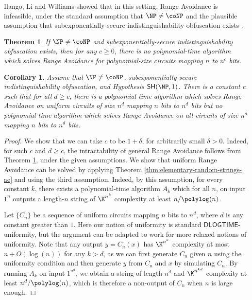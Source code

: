\documentclass[11pt]{article}
\newtheorem{theorem}{Theorem}
\newtheorem{corollary}{Corollary}
\newcommand{\SH}{\mathsf{SH}}
\newcommand{\DLOGTIME}{\mathsf{DLOGTIME}}
\begin{document}
Ilango, Li and Williams \cite{ILW23} showed that in this setting, Range Avoidance is infeasible, under the standard assumption that $\NP \neq \coNP$ and the plausible assumption that subexponentially-secure indistinguishability obfuscation exists \cite{JLS21}.

\begin{theorem}
\label{t:ILW} \cite{ILW23}
If $\NP \neq \coNP$ and subexponentially-secure indistinguishability obfuscation exists, then for any $c \geq 0$, there is no polynomial-time algorithm which solves Range Avoidance for polynomial-size circuits mapping $n$ to $n^c$ bits.
\end{theorem}

\begin{corollary}
\label{c:UnifvsNonunifP}
Assume that $\NP \neq \coNP$, subexponentially-secure indistinguishability obfuscation, and Hypothesis $\SH(\NP,1)$. There is a constant $c$ such that for all $d \geq c$, there is a polynomial-time algorithm which solves Range Avoidance on {\it uniform} circuits of size $n^d$ mapping $n$ bits to $n^d$ bits but no polynomial-time algorithm which solves Range Avoidance on all circuits of size $n^d$ mapping $n$ bits to $n^d$ bits.
\end{corollary}

\begin{proof}
We show that we can take $c$ to be $1+\delta$, for arbitrarily small $\delta > 0$. Indeed, for such $c$ and $d \geq c$, the intractability of general Range Avoidance follows from Theorem \ref{t:ILW}, under the given assumptions. We show that uniform Range Avoidance can be solved by applying Theorem \ref{thm:elementary-random-strings-ae} and using the third assumption. Indeed, by this assumption, for every constant $k$, there exists a polynomial-time algorithm $A_k$ which for all $n$, on input $1^n$ outputs a length-$n$ string of $\K^{n^k}$ complexity at least $n/\polylog(n)$.

Let $\{C_n\}$ be a sequence of uniform circuits mapping $n$ bits to $n^d$, where $d$ is any constant greater than $1$. Here our notion of uniformity is standard $\DLOGTIME$-uniformity, but the argument can be adapted to work for more relaxed notions of uniformity. Note that any output $y = C_n(x)$ has $\K^{n^k}$ complexity at most $n+O(\log(n))$ for any $k > d$, as we can first generate $C_n$ given $n$ using the uniformity condition and then generate $y$ from $C_n$ and $x$ by simulating $C_n$.  By running $A_k$ on input $1^{n^d}$, we obtain a string of length $n^d$ and $\K^{n^{kd}}$ complexity at least $n^d/\polylog(n)$, which is therefore a non-output of $C_n$ when $n$ is large enough.
\end{proof}
\end{document}
